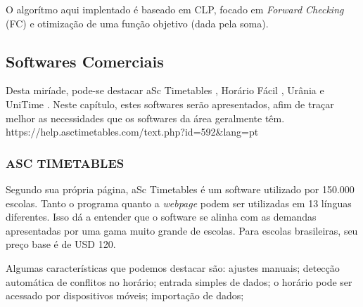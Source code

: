 \documentclass[12pt,a4paper]{article}
\begin{document}
			\par O algorítmo aqui implentado é baseado em CLP, focado em \textit{Forward Checking} (FC) e otimização de uma função objetivo (dada pela soma).

		\subsection{Softwares Comerciais}

			\par Desta miríade, pode-se destacar aSc Timetables \cite{rel_asctimetables}, Horário Fácil \cite{rel_horariofacil}, Urânia \cite{rel_urania} e UniTime \cite{rel_unitime}. Neste capítulo, estes softwares serão apresentados, afim de traçar melhor as necessidades que os softwares da área geralmente têm. https://help.asctimetables.com/text.php?id=592\&lang=pt

			\subsubsection{ASC TIMETABLES}

				\par Segundo sua própria página, aSc Timetables é um software utilizado por 150.000 escolas. Tanto o programa quanto a \textit{webpage} podem ser utilizadas em 13 línguas diferentes. Isso dá a entender que o software se alinha com as demandas apresentadas por uma gama muito grande de escolas. Para escolas brasileiras, seu preço base é de USD 120.

				\par Algumas características que podemos destacar são: ajustes manuais; detecção automática de conflitos no horário; entrada simples de dados;  o horário pode ser acessado por dispositivos móveis; importação de dados;
\end{document}
